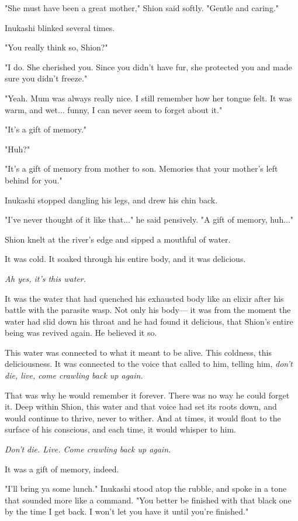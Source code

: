 "She must have been a great mother," Shion said softly. "Gentle and
caring."

Inukashi blinked several times.

"You really think so, Shion?"

"I do. She cherished you. Since you didn't have fur, she protected you
and made sure you didn't freeze."

"Yeah. Mum was always really nice. I still remember how her tongue felt.
It was warm, and wet... funny, I can never seem to forget about it."

"It's a gift of memory."

"Huh?"

"It's a gift of memory from mother to son. Memories that your mother's
left behind for you."

Inukashi stopped dangling his legs, and drew his chin back.

"I've never thought of it like that..." he said pensively. "A gift of
memory, huh..."

Shion knelt at the river's edge and sipped a mouthful of water.

It was cold. It soaked through his entire body, and it was delicious.

\emph{Ah yes, it's this water.}

It was the water that had quenched his exhausted body like an elixir
after his battle with the parasite wasp. Not only his body--- it was from
the moment the water had slid down his throat and he had found it
delicious, that Shion's entire being was revived again. He believed it
so.

This water was connected to what it meant to be alive. This coldness,
this deliciousness. It was connected to the voice that called to him,
telling him, \emph{don't die, live, come crawling back up again.}

That was why he would remember it forever. There was no way he could
forget it. Deep within Shion, this water and that voice had set its
roots down, and would continue to thrive, never to wither. And at times,
it would float to the surface of his conscious, and each time, it would
whisper to him.

\emph{Don't die. Live. Come crawling back up again.}

It was a gift of memory, indeed.

"I'll bring ya some lunch." Inukashi stood atop the rubble, and spoke in
a tone that sounded more like a command. "You better be finished with
that black one by the time I get back. I won't let you have it until
you're finished."

